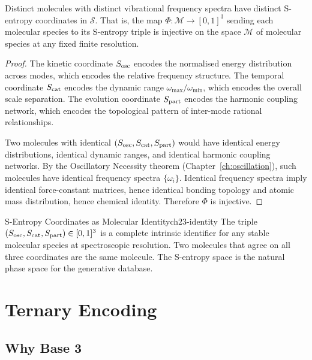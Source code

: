 \begin{theorem}
\label{thm:ch23-unique-resolution}
Distinct molecules with distinct vibrational frequency spectra have distinct
S-entropy coordinates in $\mathcal{S}$.  That is, the map
$\Phi : \mathcal{M} \to [0,1]^3$ sending each molecular species to its
S-entropy triple is injective on the space $\mathcal{M}$ of molecular
species at any fixed finite resolution.
\end{theorem}

\begin{proof}
The kinetic coordinate $S_{\mathrm{osc}}$ encodes the normalised energy distribution across
modes, which encodes the relative frequency structure.  The temporal coordinate
$S_{\mathrm{cat}}$ encodes the dynamic range $\omega_{\max}/\omega_{\min}$, which encodes
the overall scale separation.  The evolution coordinate $S_{\mathrm{part}}$ encodes the
harmonic coupling network, which encodes the topological pattern of inter-mode
rational relationships.

Two molecules with identical $(S_{\mathrm{osc}}, S_{\mathrm{cat}}, S_{\mathrm{part}})$ would have identical energy
distributions, identical dynamic ranges, and identical harmonic coupling
networks.  By the Oscillatory Necessity theorem (Chapter~\ref{ch:oscillation}),
such molecules have identical frequency spectra $\{\omega_i\}$.  Identical
frequency spectra imply identical force-constant matrices, hence identical
bonding topology and atomic mass distribution, hence chemical identity.
Therefore $\Phi$ is injective.
\end{proof}

\begin{consequence}{S-Entropy Coordinates as Molecular Identity}{ch23-identity}
The triple $(S_{\mathrm{osc}}, S_{\mathrm{cat}}, S_{\mathrm{part}}) \in [0,1]^3$ is a complete intrinsic
identifier for any stable molecular species at spectroscopic resolution.  Two
molecules that agree on all three coordinates are the same molecule.  The
S-entropy space is the natural phase space for the generative database.
\end{consequence}

\section{Ternary Encoding}
\label{sec:ch23-ternary}

\subsection{Why Base 3}
\label{sec:ch23-base3}

